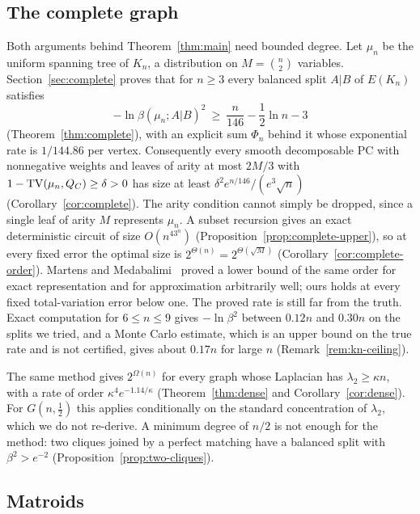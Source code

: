 \subsection{The complete graph}

Both arguments behind Theorem~\ref{thm:main} need bounded degree. Let $\mu_n$ be the uniform spanning tree of $K_n$, a distribution on $M=\binom n2$ variables. Section~\ref{sec:complete} proves that for $n\ge3$ every balanced split $A|B$ of $E(K_n)$ satisfies
\[
  -\ln\beta(\mu_n;A|B)^2\ \ge\ \frac n{146}-\frac12\ln n-3
\]
(Theorem~\ref{thm:complete}), with an explicit sum $\Phi_n$ behind it whose exponential rate is $1/144.86$ per vertex. Consequently every smooth decomposable PC with nonnegative weights and leaves of arity at most $2M/3$ with $1-\mathrm{TV}(\mu_n,Q_C)\ge\delta>0$ has size at least $\delta^2e^{n/146}/(e^3\sqrt n)$ (Corollary~\ref{cor:complete}). The arity condition cannot simply be dropped, since a single leaf of arity $M$ represents $\mu_n$. A subset recursion gives an exact deterministic circuit of size $O(n^43^n)$ (Proposition~\ref{prop:complete-upper}), so at every fixed error the optimal size is $2^{\Theta(n)}=2^{\Theta(\sqrt M)}$ (Corollary~\ref{cor:complete-order}). Martens and Medabalimi~\cite{MartensMedabalimi14} proved a lower bound of the same order for exact representation and for approximation arbitrarily well; ours holds at every fixed total-variation error below one. The proved rate is still far from the truth. Exact computation for $6\le n\le9$ gives $-\ln\beta^2$ between $0.12n$ and $0.30n$ on the splits we tried, and a Monte Carlo estimate, which is an upper bound on the true rate and is not certified, gives about $0.17n$ for large $n$ (Remark~\ref{rem:kn-ceiling}).

The same method gives $2^{\Omega(n)}$ for every graph whose Laplacian has $\lambda_2\ge\kappa n$, with a rate of order $\kappa^4e^{-1.14/\kappa}$ (Theorem~\ref{thm:dense} and Corollary~\ref{cor:dense}). For $G(n,\frac12)$ this applies conditionally on the standard concentration of $\lambda_2$, which we do not re-derive. A minimum degree of $n/2$ is not enough for the method: two cliques joined by a perfect matching have a balanced split with $\beta^2>e^{-2}$ (Proposition~\ref{prop:two-cliques}).

\subsection{Matroids}

